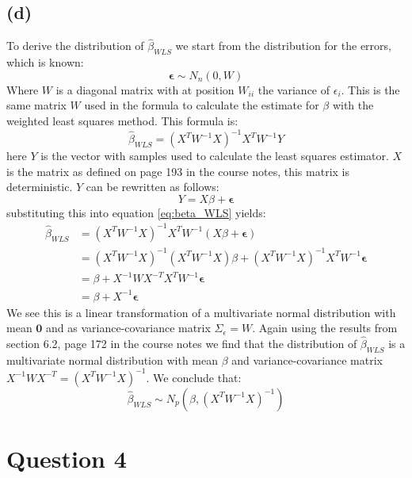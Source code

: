 \documentclass[a4paper]{article}
\begin{document}
\subsection*{(d)}
To derive the distribution of $\hat{\beta}_{WLS}$ we start from the distribution for the errors, which is known:
\begin{equation*}
	\mathbf{\epsilon} \sim N_n(0, W)
\end{equation*}
Where $W$ is a diagonal matrix with at position $W_{ii}$ the variance of $\epsilon_i$. This is the same matrix $W$ used in the formula to calculate the estimate for $\beta$ with the weighted least squares method. This formula is:
\begin{equation}
	\hat{\beta}_{WLS} = (X^TW^{-1}X)^{-1} X^T W^{-1}Y
	\label{eq:beta_WLS}
\end{equation}
here $Y$ is the vector with samples used to calculate the least squares estimator. $X$ is the matrix as defined on page 193 in the course notes, this matrix is deterministic. $Y$ can be rewritten as follows:
\begin{equation*}
	Y = X \beta + \mathbf{\epsilon}
\end{equation*}
substituting this into equation \ref{eq:beta_WLS} yields:
\begin{align*}
	\hat{\beta}_{WLS} &= (X^TW^{-1}X)^{-1} X^TW^{-1}(X\beta+\mathbf{\epsilon})\\
			  &= (X^TW^{-1}X)^{-1} (X^TW^{-1}X) \beta + (X^TW^{-1}X)^{-1} X^TW^{-1}\mathbf{\epsilon}\\
			  &= \beta + X^{-1} W X^{-T} X^T W^{-1} \mathbf{\epsilon}\\
			  &= \beta + X^{-1} \mathbf{\epsilon} 
\end{align*}
We see this is a linear transformation of a multivariate normal distribution with mean $\mathbf{0}$ and as variance-covariance matrix $\Sigma_{\epsilon}=W$. Again using the results from section 6.2, page 172 in the course notes we find that the distribution of $\hat{\beta}_{WLS}$ is a multivariate normal distribution with mean $\beta$ and variance-covariance matrix $X^{-1} W X^{-T} = (X^T W^{-1} X)^{-1}$. We conclude that:
\begin{equation*}
	\hat{\beta}_{WLS} \sim N_p(\beta, (X^TW^{-1}X)^{-1})
\end{equation*}


\section*{Question 4}
\end{document}
